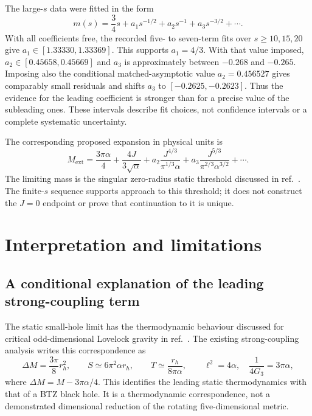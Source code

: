 \documentclass[11pt,a4paper]{article}
\newcommand{\ext}{\mathrm{ext}}
\begin{document}
The large-$s$ data were fitted in the form
\begin{equation}
 m(s)=\frac34s+a_1s^{-1/2}+a_2s^{-1}+a_3s^{-3/2}+\cdots .
 \label{eq:strong}
\end{equation}
With all coefficients free, the recorded five- to seven-term fits over $s\ge10,15,20$ give $a_1\in[1.33330,1.33369]$. This supports $a_1=4/3$. With that value imposed, $a_2\in[0.45658,0.45669]$ and $a_3$ is approximately between $-0.268$ and $-0.265$. Imposing also the conditional matched-asymptotic value $a_2=0.456527$ gives comparably small residuals and shifts $a_3$ to $[-0.2625,-0.2623]$. Thus the evidence for the leading coefficient is stronger than for a precise value of the subleading ones. These intervals describe fit choices, not confidence intervals or a complete systematic uncertainty.

The corresponding proposed expansion in physical units is
\begin{equation}
 M_\ext=\frac{3\pi\alpha}{4}+\frac{4J}{3\sqrt\alpha}
 +a_2\frac{J^{4/3}}{\pi^{1/3}\alpha}
 +a_3\frac{J^{5/3}}{\pi^{2/3}\alpha^{3/2}}+\cdots .
 \label{eq:physicalstrong}
\end{equation}
The limiting mass is the singular zero-radius static threshold discussed in ref.~\cite{KKR2023}. The finite-$s$ sequence supports approach to this threshold; it does not construct the $J=0$ endpoint or prove that continuation to it is unique.

\section{Interpretation and limitations}
\subsection{A conditional explanation of the leading strong-coupling term}
The static small-hole limit has the thermodynamic behaviour discussed for critical odd-dimensional Lovelock gravity in ref.~\cite{Dadhich2012}. The existing strong-coupling analysis writes this correspondence as
\begin{equation}
 \Delta M=\frac{3\pi}{8}r_h^2,\qquad
 S\simeq6\pi^2\alpha r_h,\qquad T\simeq\frac{r_h}{8\pi\alpha},
 \qquad \ell^2=4\alpha,\quad\frac1{4G_3}=3\pi\alpha,
 \label{eq:dictionary}
\end{equation}
where $\Delta M=M-3\pi\alpha/4$. This identifies the leading static thermodynamics with that of a BTZ black hole. It is a thermodynamic correspondence, not a demonstrated dimensional reduction of the rotating five-dimensional metric.
\end{document}
